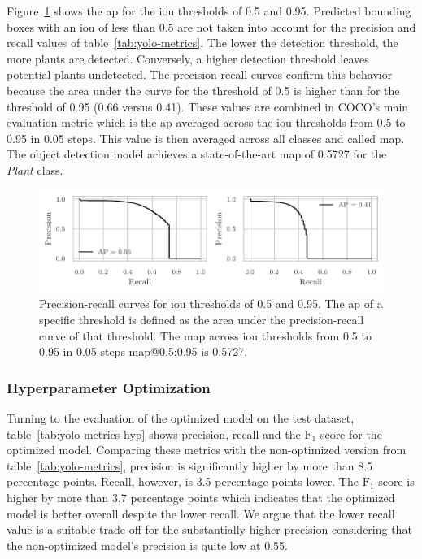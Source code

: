 \documentclass[final]{vutinfth} %
\begin{document}
Figure~\ref{fig:yolo-ap} shows the \gls{ap} for the \gls{iou}
thresholds of \num{0.5} and \num{0.95}. Predicted bounding boxes with
an \gls{iou} of less than \num{0.5} are not taken into account for the
precision and recall values of table~\ref{tab:yolo-metrics}. The lower
the detection threshold, the more plants are detected. Conversely, a
higher detection threshold leaves potential plants undetected. The
precision-recall curves confirm this behavior because the area under
the curve for the threshold of \num{0.5} is higher than for the
threshold of \num{0.95} (\num{0.66} versus \num{0.41}). These values
are combined in COCO's \cite{lin2015} main evaluation metric which is
the \gls{ap} averaged across the \gls{iou} thresholds from \num{0.5}
to \num{0.95} in \num{0.05} steps. This value is then averaged across
all classes and called \gls{map}. The object detection model achieves
a state-of-the-art \gls{map} of \num{0.5727} for the \emph{Plant} class.

\begin{figure}
  \centering
  \includegraphics{graphics/APpt5-pt95.pdf}
  \caption[Object detection AP@0.5 and AP@0.95.]{Precision-recall
    curves for \gls{iou} thresholds of \num{0.5} and \num{0.95}. The
    \gls{ap} of a specific threshold is defined as the area under the
    precision-recall curve of that threshold. The \gls{map} across
    \gls{iou} thresholds from \num{0.5} to \num{0.95} in \num{0.05}
    steps \gls{map}@0.5:0.95 is \num{0.5727}.}
  \label{fig:yolo-ap}
\end{figure}

\subsubsection{Hyperparameter Optimization}
\label{sssec:yolo-hyp-opt}

Turning to the evaluation of the optimized model on the test dataset,
table~\ref{tab:yolo-metrics-hyp} shows precision, recall and the
$\mathrm{F}_1$-score for the optimized model. Comparing these metrics
with the non-optimized version from table~\ref{tab:yolo-metrics},
precision is significantly higher by more than \num{8.5} percentage
points. Recall, however, is \num{3.5} percentage points lower. The
$\mathrm{F}_1$-score is higher by more than \num{3.7} percentage
points which indicates that the optimized model is better overall
despite the lower recall. We argue that the lower recall value is a
suitable trade off for the substantially higher precision considering
that the non-optimized model's precision is quite low at \num{0.55}.
\end{document}
